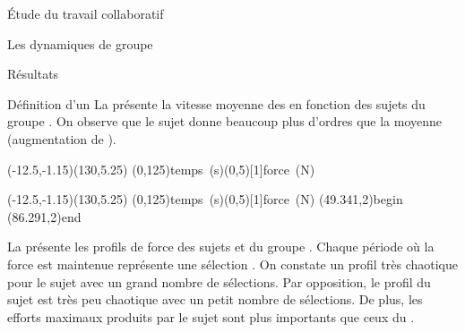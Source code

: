 \documentclass[myfrancais]{mythesis}
\begin{document}
\begin{mypart}{Étude du travail collaboratif}
\begin{mychapter}{Les dynamiques de groupe}
\begin{mysection}{Résultats}
\begin{mysubsection}{Définition d'un }
					La  présente la vitesse moyenne des   en fonction des sujets du groupe .
					On observe que le sujet  donne beaucoup plus d'ordres que la moyenne (augmentation de ).

					\begin{myfigure}
						\begin{mysubfigure}[\textwidth]
							\begin{myps}(-12.5,-1.15)(130,5.25)
								\myaxes[labels=all,ticks=all,Dx=25](0,125){temps~{(s)}}(0,5)[1]{force~(N)}
							\end{myps}
						\end{mysubfigure}
						\begin{mysubfigure}[\textwidth]
							\begin{myps}(-12.5,-1.15)(130,5.25)
								\myaxes[labels=all,ticks=all,Dx=25](0,125){temps~{(s)}}(0,5)[1]{force~(N)}
								\pnode(49.341,2){begin}
								\pnode(86.291,2){end}
								\ncput*{\textcolor{myblue}{\small selection}}
							\end{myps}
						\end{mysubfigure}
					\end{myfigure}

					La  présente les profils de force  des sujets  et  du groupe .
					Chaque période où la force est maintenue représente une sélection .
					On constate un profil très chaotique pour le sujet  avec un grand nombre de sélections.
					Par opposition, le profil du sujet  est très peu chaotique avec un petit nombre de sélections.
					De plus, les efforts maximaux produits par le sujet  sont plus importants que ceux du .


\end{mysubsection}
\end{mysection}
\end{mychapter}
\end{mypart}
\end{document}
